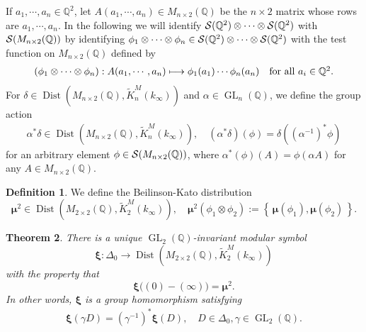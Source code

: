\documentclass[12pt,amstex,amssymb]{article}
\theoremstyle{plain}
\newtheorem{theorem}{Theorem}[subsection]
\newcommand{\PP}{\mathbb{P}}
\theoremstyle{definition}
\newtheorem{definition}[theorem]{Definition}
\def\lra{\longrightarrow}
\def\g{\gamma}
\def\cS{{\cal S}}
\def\Q{{\mathbb Q}}
\def\g{\gamma}
\newcommand{\be}{\begin{eqnarray*}}
\newcommand{\ee}{\end{eqnarray*}}
\newcommand{\bea}{\begin{eqnarray}}
\newcommand{\eea}{\end{eqnarray}}
\newcommand{\GL}{\operatorname{GL}}
\newcommand{\Dist}{\operatorname{Dist}}
\begin{document}


If $a_1, \cdots, a_n \in \Q^2$, let $A(a_1, \cdots, a_n) \in M_{n\times 2}(\Q)$ be the $n\times2$ matrix whose rows are $a_1, \cdots, a_n$.
In the following we will identify $\cS(\Q^2)\otimes\cdots \otimes \cS(\Q^2)$ with  $\cS(M_{n\times 2}(\Q))$ by identifying $\phi_1\otimes \cdots \otimes \phi_n\in \cS(\Q^2)\otimes \cdots \otimes\cS(\Q^2)$ with the test function on $M_{n\times 2}(\Q)$ defined by
\bea \label{identify}
(\phi_1\otimes \cdots \otimes \phi_n) : A(a_1,\cdots, a_n)\longmapsto \phi_1(a_1)\cdots \phi_n(a_n)\quad\hbox{\rm for all $a_i\in \Q^2$}.
\eea
For $\delta\in \Dist(M_{n\times 2}(\Q),\tilde K^M_n(k_\infty))$ and $\alpha\in \GL_n(\Q)$, we define the group action 
\be
\alpha^*\delta \in \Dist(M_{n \times 2}(\Q),\tilde K^M_n(k_\infty)), \quad 
(\alpha^* \delta)(\phi) = \delta((\alpha^{-1})^{*}\phi)
\ee
for an arbitrary element $\phi\in \cS(M_{n\times 2}(\Q))$, where $\alpha^*(\phi)(A) = \phi(\alpha A)$ 
for any $A\in M_{n\times 2}(\Q)$.

\begin{definition}\cite[1.4.2]{Colmez}\label{BKdist}
We define the Beilinson-Kato distribution 
$$
{{\bm\mu}^2} \in \Dist(M_{2\times2}(\Q),\tilde K^M_2(k_\infty)), \quad
{{\bm\mu}^2}(\phi_1\otimes \phi_2) := \left\{\,{\bm\mu}(\phi_1),{\bm\mu}(\phi_2)\,\right\}.
$$
\end{definition}


\begin{theorem}\label{modularsymbol}
There is a unique $\GL_2(\Q)$-invariant modular symbol
$$
{\bm\xi} : \Delta_0 \lra \Dist(M_{2\times2}(\Q),\tilde K^M_2(k_\infty))
$$
with the property that 
$${\bm\xi}\biggl((0)-(\infty)\biggr) = {{\bm\mu}^2}. $$
In other words, $\bm\xi$ is a group homomorphism satisfying
\be
\bm\xi (\g D) = (\g^{-1})^* \bm\xi(D), \quad D \in \Delta_0, \g \in \GL_2(\Q).
\ee
\end{theorem}
\end{document}
